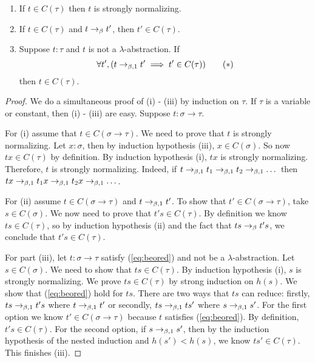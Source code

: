 \begin{boxlem}\label{lem:computableSN}
    \hfill
    \begin{enumerate}
        \item If $t \in C(\tau)$ then $t$ is strongly normalizing.
        \item If $t \in C(\tau)$ and $t \to_{\beta} t'$, then $t' \in C(\tau)$.
        \item {Suppose $t : \tau$ and $t$ is not a $\lambda$-abstraction. If
            \begin{equation} \label{eq:beored}
                \forall t', (t \to_{\beta, 1} t' \implies t' \in C(\tau)) \tag{$*$}
            \end{equation}
            then $t \in C(\tau)$.}
    \end{enumerate}
\end{boxlem}
\begin{proof}
    We do a simultaneous proof of (i) - (iii) by induction on $\tau$.
    If $\tau$ is a variable or constant, then (i) - (iii) are easy.
    Suppose $t : \sigma \to \tau$. 

    For (i) assume that $t \in C(\sigma \to \tau)$. 
    We need to prove that $t$ is strongly normalizing.
    Let $x : \sigma$, then by induction hypothesis (iii), $x \in C(\sigma)$.
    So now $tx \in C(\tau)$ by definition.
    By induction hypothesis (i), $tx$ is strongly normalizing. 
    Therefore, $t$ is strongly normalizing. 
    Indeed, if $t \to_{\beta, 1} t_1 \to_{\beta, 1} t_2 \to_{\beta, 1} \dots$ then $tx \to_{\beta, 1} t_1x \to_{\beta, 1} t_2x \to_{\beta, 1} \dots$.

    For (ii) assume $t \in C(\sigma \to \tau)$ and $t \to_{\beta, 1} t'$. 
    To show that $t' \in C(\sigma \to \tau)$, take $s \in C(\sigma)$.
    We now need to prove that $t's \in C(\tau)$. 
    By definition we know $ts \in C(\tau)$, so by induction hypothesis (ii) and the fact that $ts \to_{\beta} t's$, we conclude that $t's \in C(\tau)$.

    For part (iii), let $t : \sigma \to \tau$ satisfy (\ref{eq:beored}) and not be a $\lambda$-abstraction.
    Let $s \in C(\sigma)$. 
    We need to show that $ts \in C(\tau)$.
    By induction hypothesis (i), $s$ is strongly normalizing. 
    We prove $ts \in C(\tau)$ by strong induction on $h(s)$. 
    We show that (\ref{eq:beored}) hold for $ts$. 
    There are two ways that $ts$ can reduce: 
    firstly, $ts \to_{\beta, 1} t's$ where $t \to_{\beta, 1} t'$ or secondly, $ts \to_{\beta, 1}  ts'$ where $s \to_{\beta, 1} s'$.
    For the first option we know $t' \in C(\sigma \to \tau)$ because $t$ satisfies (\ref{eq:beored}).  
    By definition, $t's \in C(\tau)$. 
    For the second option, if $s \to_{\beta, 1} s'$, then by the induction hypothesis of the nested induction and $h(s') < h(s)$, we know $ts' \in C(\tau)$.
    This finishes (iii).
\end{proof}

